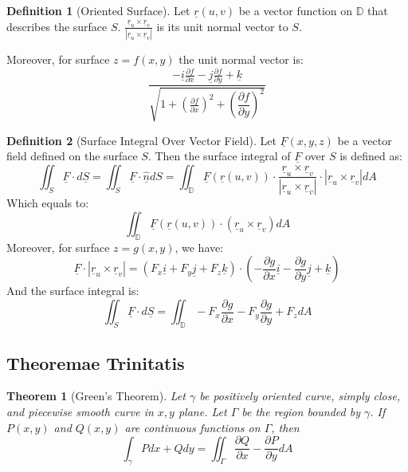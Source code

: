 \documentclass[12pt,a4paper]{article}
\newtheorem{theorem}{Theorem}[subsection]
\theoremstyle{definition}
\newtheorem{definition}{Definition}[section]
\theoremstyle{remark}
\begin{document}
\begin{definition}[Oriented Surface]
	Let $\underline{r}(u,v)$ be a vector function on $\mathbb{D}$ that describes the surface $S$.
	$ \displaystyle\frac{\underline{r}_u \times \underline{r}_v}{| \underline{r}_u \times \underline{r}_v|}$ is its unit normal vector to $S$.

	Moreover, for surface $z = f(x,y)$ the unit normal vector is:
	\[
		\frac{-\underline{i} \displaystyle \frac{\partial f}{\partial x} - \underline{j} \frac{\partial f}{\partial y} + \underline{k}}
		{\sqrt{1 + \left( \displaystyle\frac{\partial f}{\partial x} \right)^2 + \left( \dfrac{\partial f}{\partial y} \right)^2}}
	\]
\end{definition}
\begin{definition}[Surface Integral Over Vector Field]
	Let $\underline{F}(x,y,z)$ be a vector field defined on the surface $S$.
	Then the surface integral of $\underline{F}$ over $S$ is defined as:
	\[
		\iint_{S} \underline{F} \cdot d\underline{S}
	=
	\iint_{S} \underline{F} \cdot \hat{ \underline{n}} dS
	=
		\iint_{\mathbb{D}} \underline{F}(\underline{r}(u,v)) \cdot \frac{\underline{r}_u \times \underline{r}_v}{| \underline{r}_u \times \underline{r}_v|} \cdot | \underline{r}_u \times \underline{r}_v| dA
	\]
Which equals to:
\[
	\iint_{\mathbb{D}} \underline{F}(\underline{r}(u,v)) \cdot \left( \underline{r}_u \times \underline{r}_v \right)dA
\]	
Moreover, for surface $z = g(x,y)$, we have:
\[
	\underline{F} \cdot | \underline{r}_u \times \underline{r}_v| 
=
	(F_x \underline{i} + F_y \underline{j} + F_z \underline{k}) \cdot \left( - \dfrac{ \partial g}{ \partial x} \underline{i} - \frac{ \partial g}{ \partial y} \underline{j} + \underline{k} \right)
\]
And the surface integral is:
\[
	\iint_{S} \underline{F} \cdot d\underline{S}
=
\iint _{ \mathbb{D}} - F_x \frac{ \partial g}{ \partial x} - F_y \frac{ \partial g}{ \partial y} + F_z dA
\]
\end{definition}


\subsection{Theoremae Trinitatis}

\begin{theorem}[Green's Theorem]
	Let $\gamma$ be positively oriented curve, simply close, and piecewise smooth curve in $x,y$ plane.
	Let $ \Gamma$ be the region bounded by $\gamma$.
	If $ P(x,y)$ and $Q(x,y)$ are continuous functions on $\Gamma$, then
\[
	\int _{\gamma} P dx + Qdy = \iint _{\Gamma} \frac{\partial Q}{\partial x} - \frac{\partial P}{\partial y} dA
\]

\end{theorem}
\end{document}
